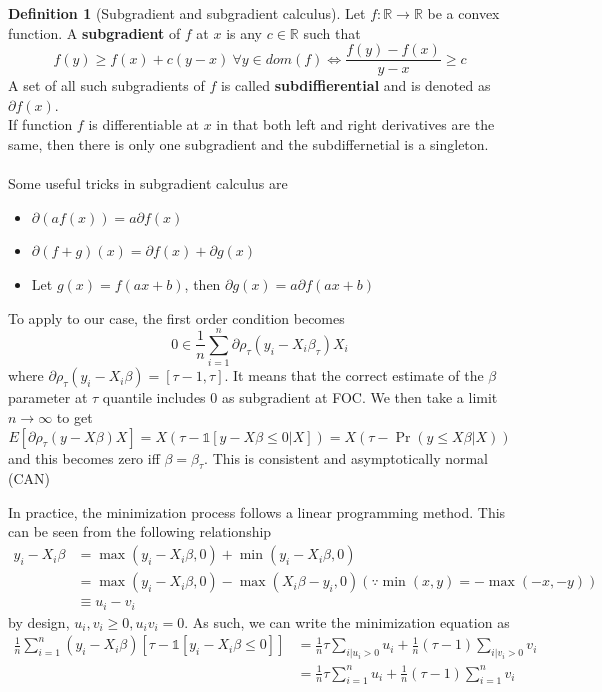 \documentclass[12pt]{article}
\theoremstyle{definition}
\newtheorem{definition}{Definition}[section]
\theoremstyle{property}
\theoremstyle{assumption}
\theoremstyle{example}
\theoremstyle{comment}
\begin{document}
\begin{mdframed}[backgroundcolor=blue!5] 
\begin{definition}[Subgradient and subgradient calculus] Let $f:\mathbb{R}\to\mathbb{R}$ be a convex function. A \textbf{subgradient} of $f$ at $x$ is any $c\in\mathbb{R}$ such that
\[
f(y) \geq f(x) + c(y-x)\ \forall y\in dom(f) \iff \frac{f(y)-f(x)}{y-x}\geq c
\]
A set of all such subgradients of $f$ is called \textbf{subdiffierential} and is denoted as $\partial f(x)$.\\
If function $f$ is differentiable at $x$ in that both left and right derivatives are the same, then there is only one subgradient and the subdiffernetial is a singleton. \\
\\
Some useful tricks in subgradient calculus are
\begin{itemize}
\item $\partial(af(x)) =a \partial f(x)$
\item $\partial(f+g)(x) = \partial f(x)+\partial g(x)$
\item Let $g(x) = f(ax+b)$, then $\partial g(x) =a \partial f(ax+b)$
\end{itemize}
\end{definition}
\end{mdframed}
\par
To apply to our case, the first order condition becomes
\[
0\in \frac{1}{n}\sum_{i=1}^n\partial \rho_\tau (y_i-X_i\beta_\tau)X_i
\]
where $\partial \rho_\tau (y_i-X_i\beta) =[\tau-1,\tau]$. It means that the correct estimate of the $\beta$ parameter at $\tau$ quantile includes 0 as subgradient at FOC. We then take a limit $n\to\infty$ to get
\[
E[\partial \rho_\tau (y-X\beta)X] = X(\tau-\mathbb{1}[y-X\beta\leq0|X])=X(\tau-\Pr(y\leq X\beta|X))
\]
and this becomes zero iff $\beta=\beta_\tau$. This is consistent and asymptotically normal (CAN)\par
In practice, the minimization process follows a linear programming method. This can be seen from the following relationship
\[
\begin{aligned}
y_i - X_i\beta &=\max(y_i-X_i\beta,0)+\min(y_i-X_i\beta,0)\\ 
 &=\max(y_i-X_i\beta,0)-\max(X_i\beta-y_i,0) (\because \min(x,y)=-\max(-x,-y))\\ 
 &\equiv u_i-v_i
\end{aligned}
\]
by design, $u_i ,v_i\geq0, u_iv_i=0$. As such, we can write the minimization equation as
\[
\begin{aligned}
\frac{1}{n}\sum_{i=1}^n (y_i-X_i\beta)[\tau-\mathbb{1}[y_i-X_i\beta\leq0]]&=\frac{1}{n}\tau\sum_{i|u_i>0}u_i+\frac{1}{n}(\tau-1)\sum_{i|v_i>0}v_i\\
&=\frac{1}{n}\tau\sum_{i=1}^nu_i+\frac{1}{n}(\tau-1)\sum_{i=1}^nv_i\\
\end{aligned}
\]
\end{document}

